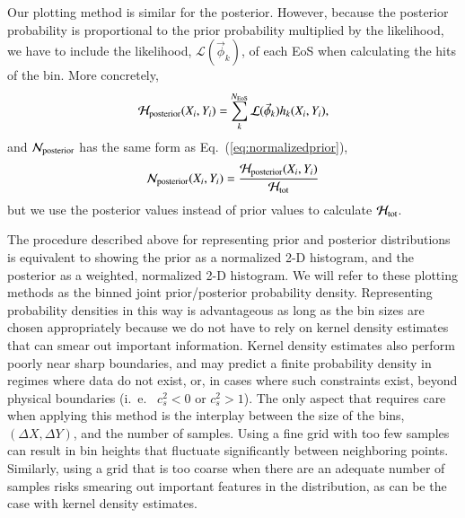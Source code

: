 \documentclass[aps,prd,nofootinbib,tightenlines,notitlepage,floatfix,superscriptaddress,showkeys,twocolumn]{revtex4-1}
\begin{document}
Our plotting method is similar for the posterior. However, because the posterior probability is proportional to the prior probability multiplied by the likelihood, we have to include the likelihood, $\mathcal{L}(\vec{\phi}_k)$, of each EoS when calculating the hits of the bin. More concretely,
\begin{equation}
    \mathcal{H}_{\rm posterior}(X_i,Y_i)=\sum_k^{N_{\rm EoS}} \mathcal{L}(\vec{\phi}_k) h_k(X_i,Y_i), 
\end{equation}
and 
$\mathcal{N}_{\rm posterior}$ has the same form as Eq.~(\ref{eq:normalizedprior}), 
\begin{equation}
    \mathcal{N}_{\rm posterior}(X_i,Y_i)=\frac{\mathcal{H}_{\rm posterior}(X_i,Y_i) }{\mathcal{H}_{\rm tot}}
\end{equation}
but we use the posterior values instead of prior values to calculate $\mathcal{H}_{\rm tot}$.

The procedure described above for representing prior and posterior distributions is equivalent to showing the prior as a normalized 2-D histogram, and the posterior as a weighted, normalized 2-D histogram. We will refer to these plotting methods as the binned joint prior/posterior probability density. Representing probability densities in this way is advantageous as long as the bin sizes are chosen appropriately because we do not have to rely on kernel density estimates that can smear out important information. Kernel density estimates also perform poorly near sharp boundaries, and may predict a finite probability density in regimes where data do not exist, or, in cases where such constraints exist, beyond physical boundaries (i.~e.~ $c_s^2 < 0$ or $c_s^2 > 1$). The only aspect that requires care when applying this method is the interplay between the size of the bins, $(\Delta X, \Delta Y)$, and the number of samples. Using a fine grid with too few samples can result in bin heights that fluctuate significantly between neighboring points. Similarly, using a grid that is too coarse when there are an adequate number of samples risks smearing out important features in the distribution, as can be the case with kernel density estimates. 
\end{document}
